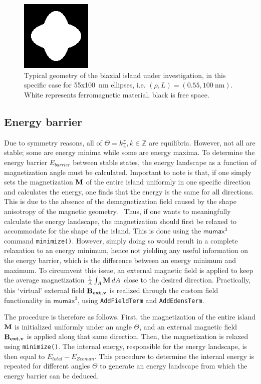 \documentclass[11pt,a4paper,english]{article}
\newcommand{\code}[1]{\texttt{#1}}
\newcommand{\mumax}{$\mathsf{mumax}^3$}
\begin{document}
\begin{figure}
    \centering
    \includegraphics[width=0.3\columnwidth]{Figures/biaxial_island/Geometry/geomPlus55.png}
    \caption{Typical geometry of the biaxial island under investigation, in this specific case for 55x\SI{100}{\nano\metre} ellipses, i.e. $(\rho, L)=(0.55, \SI{100}{\nano\metre})$. White represents ferromagnetic material, black is free space.}
    \label{fig:biaxial_island:geometryTypical}
\end{figure}

\subsection{Energy barrier}
\label{par:Biaxial_EnergyBarrier}
Due to symmetry reasons, all of $\Theta = k\frac{\pi}{4} , k\in\mathbb{Z}$ are equilibria. However, not all are stable; some are energy minima while some are energy maxima. To determine the energy barrier $E_{barrier}$ between stable states, the energy landscape as a function of magnetization angle must be calculated. Important to note is that, if one simply sets the magnetization $\vb{M}$ of the entire island uniformly in one specific direction and calculates the energy, one finds that the energy is the same for all directions. This is due to the absence of the demagnetization field caused by the shape anisotropy of the magnetic geometry.~\cite{Nonmonotonic_reversal} Thus, if one wants to meaningfully calculate the energy landscape, the magnetization should first be relaxed to accommodate for the shape of the island. This is done using the \mumax{} command \code{minimize()}. However, simply doing so would result in a complete relaxation to an energy minimum, hence not yielding any useful information on the energy barrier, which is the difference between an energy minimum and maximum. To circumvent this issue, an external magnetic field is applied to keep the average magnetization $\frac{1}{A}\int_A \vb{M}\,dA$ close to the desired direction. Practically, this `virtual' external field $\vb{B_{ext,v}}$ is realized through the custom field functionality in \mumax{}, using \code{AddFieldTerm} and \code{AddEdensTerm}. \par
The procedure is therefore as follows. First, the magnetization of the entire island $\vb{M}$ is initialized uniformly under an angle $\Theta$, and an external magnetic field $\vb{B_{ext,v}}$ is applied along that same direction. Then, the magnetization is relaxed using \code{minimize()}. The internal energy, responsible for the energy landscape, is then equal to $E_{total} - E_{Zeeman}$. This procedure to determine the internal energy is repeated for different angles $\Theta$ to generate an energy landscape from which the energy barrier can be deduced.
\end{document}
